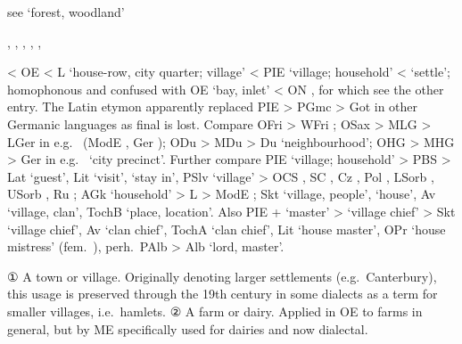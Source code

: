 \documentclass[12pt,letterpaper,oneside,article,draft]{memoir}
\begin{document}
\begin{Lemma}
 see  ‘forest, woodland’
\end{Lemma}

\begin{Lemma}
\begin{Also}
	, , , , , 
\end{Also}
\begin{Etymology}
	< OE  < L  ‘house-row, city quarter; village’ < PIE  ‘village; household’
		<  ‘settle’; homophonous and confused with OE  ‘bay, inlet’ < ON ,
		for which see the other  entry.
	The Latin etymon  apparently replaced PIE  > PGmc  >
		Got   in other Germanic languages as final  is lost.
	Compare
	OFri  > WFri ;
	OSax  > MLG  > LGer  
		in e.g.\  (ModE , Ger );
	ODu  > MDu  > Du  ‘neighbourhood’;
	OHG  > MHG  > Ger  in e.g.\  ‘city precinct’.
	Further compare 
	PIE  ‘village; household’ >
		PBS  > Lat  ‘guest’, Lit  ‘visit’,  ‘stay in’,
			PSlv  ‘village’ > OCS  , SC  ,
			Cz , Pol , LSorb , USorb , Ru  ;
		AGk   ‘household’ > L > ModE ;
		Skt   ‘village, people’,   ‘house’,
		Av   ‘village, clan’, TochB  ‘place, location’.
	Also PIE  +  ‘master’ >  ‘village chief’ >
		Skt   ‘village chief’, Av   ‘clan chief’,
		TochA  ‘clan chief’, Lit  ‘house master’,
		OPr  ‘house mistress’ (fem.\ ),
		perh.\ PAlb  > Alb  ‘lord, master’.
\end{Etymology}
\begin{Definitions}
	① A town or village. Originally denoting larger settlements (e.g.\ Canterbury), this usage is preserved through the 19th century in some dialects as a term for smaller villages, i.e.\ hamlets.
	② A farm or dairy. Applied in OE to farms in general, but by ME specifically used for dairies and now dialectal.

\end{Definitions}
\end{Lemma}
\end{document}
